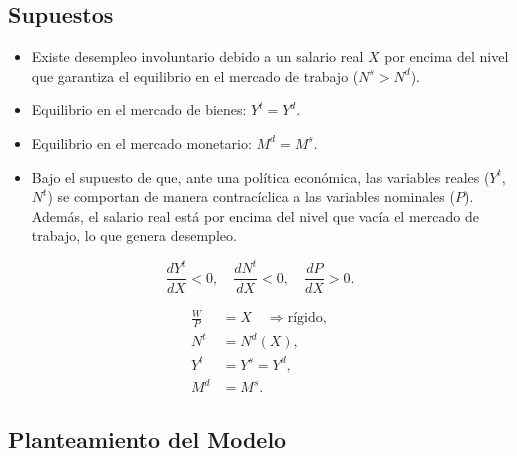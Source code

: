 \documentclass[
  doc,
  floatsintext,
  longtable,
  a4paper,
  nolmodern,
  notxfonts,
  notimes,
  12pt,
  colorlinks=true,linkcolor=blue,citecolor=blue,urlcolor=blue]{apa7}
\providecommand{\tightlist}{%
  \setlength{\itemsep}{0pt}\setlength{\parskip}{0pt}}
\begin{document}
\subsection{Supuestos}\label{supuestos-2}

\begin{itemize}
\tightlist
\item
  Existe desempleo involuntario debido a un salario real \(X\) por
  encima del nivel que garantiza el equilibrio en el mercado de trabajo
  (\(N^s > N^d\)).
\item
  Equilibrio en el mercado de bienes: \(Y^t = Y^d\).
\item
  Equilibrio en el mercado monetario: \(M^d = M^s\).
\item
  Bajo el supuesto de que, ante una política económica, las variables
  reales (\(Y^t\), \(N^t\)) se comportan de manera contracíclica a las
  variables nominales (\(P\)). Además, el salario real está por encima
  del nivel que vacía el mercado de trabajo, lo que genera desempleo.
\end{itemize}

\[
\frac{dY^t}{dX} < 0, \quad \frac{dN^t}{dX} < 0, \quad \frac{dP}{dX} > 0.
\]

\[
\begin{aligned}
\frac{W}{P} &= X \quad \Rightarrow \text{rígido}, \\
N^t &= N^d(X), \\
Y^t &= Y^s = Y^d, \\
M^d &= M^s.
\end{aligned}
\]

\subsection{Planteamiento del Modelo}\label{planteamiento-del-modelo}
\end{document}
